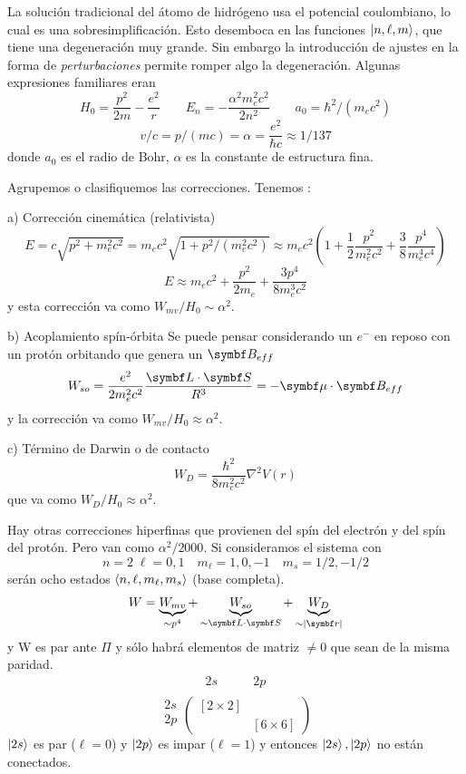 \documentclass[10pt,oneside]{CBFT_book}
\begin{document}
La solución tradicional del átomo de hidrógeno usa el potencial coulombiano, lo cual es una
sobresimplificación. 
Esto desemboca en las funciones $\Ket{n,\ell,m}$, que tiene una degeneración muy grande.
Sin embargo la introducción de ajustes en la forma de {\it perturbaciones} permite romper algo 
la degeneración.
Algunas expresiones familiares eran
\[
	H_0=\frac{p^2}{2m} - \frac{e^2}{r} \qquad E_n = -\frac{\alpha^2m_e^2c^2}{2n^2} \qquad 
	a_0 = \hbar^2/(m_ec^2)
\]
\[
	v/c = p/(mc) = \alpha = \frac{e^2}{\hbar c} \approx 1/137
\]
donde $a_0$ es el radio de Bohr, $\alpha$ es la constante de estructura fina.

Agrupemos o clasifiquemos las correcciones. Tenemos :

a) Corrección cinemática (relativista)
\[	
	E = c \sqrt{p^2 + m_e^2c^2} = m_ec^2\sqrt{1 + p^2/(m_e^2c^2)} \approx 
	m_ec^2 \left( 1 + \frac{1}{2}\frac{p^2}{m_e^2c^2} + \frac{3}{8}\frac{p^4}{m_e^4c^4} \right)
\]
\[
	E \approx m_ec^2 + \frac{p^2}{2m_e} + \frac{3p^4}{8m_e^3c^2}
\]
y esta corrección va como $W_{mv}/H_0 \sim \alpha^2$.

b) Acoplamiento spín-órbita
Se puede pensar considerando un $e^-$ en reposo con un protón orbitando que genera un $\vb{B}_{eff}$
\[
	W_{so} = \frac{e^2}{2m_e^2c^2} \frac{\vb{L}\cdot\vb{S}}{R^3} = -\vb{\mu}\cdot\vb{B}_{eff}
\]
y la corrección va como $W_{mv}/H_0 \approx \alpha^2$.

c) Término de Darwin o de contacto
\[
	W_D = \frac{\hbar^2}{8m_e^2c^2} \nabla^2 V(r)
\]
que va como  $W_{D}/H_0 \approx \alpha^2$.

Hay otras correcciones hiperfinas que provienen del spín del electrón y del spín del protón. Pero van como 
$\alpha^2/2000$.
Si consideramos el sistema con 
\[
	n=2 \; \ell=0,1 \quad m_\ell = 1,0,-1 \quad m_s=1/2,-1/2
\]
serán ocho estados $\Braket{n,\ell,m_\ell,m_s}$ (base completa).
\[
	W = \underbrace{W_{mv}}_{\sim p^4} + \underbrace{W_{so}}_{\sim \vb{L}\cdot\vb{S}} + 
	\underbrace{W_D}_{\sim |\vb{r}|}
\]
y W es par ante $\Pi$ y sólo habrá elementos de matriz $\neq 0$ que sean de la misma paridad.
\[
	\begin{matrix}
	2s & \qquad 2p \\	 
	\end{matrix}
\]
\[
\begin{matrix}
 2s\\
 2p\\
\end{matrix}
	\begin{pmatrix}
	[2\times 2] & \\
	& [ 6\times 6 ] 
	\end{pmatrix}
\]
$\Ket{2s}$ es par ($\ell=0$) y $\Ket{2p}$ es impar ($\ell=1$) y entonces $\Ket{2s}, \Ket{2p}$
no están conectados.
\end{document}
